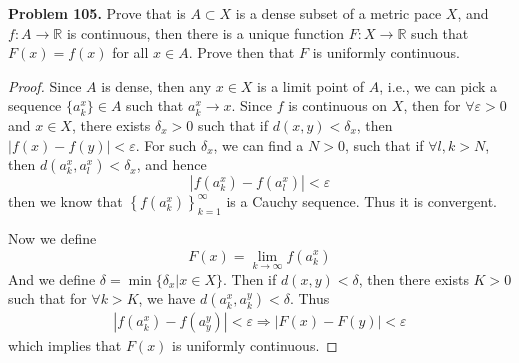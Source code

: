\documentclass[12pt,leqno]{amsart}
\theoremstyle{definition}
\numberwithin{equation}{subsection}
\begin{document}
\noindent
{\bf Problem 105.}
Prove that is $A\subset X$ is a dense subset of a metric pace $X$, and $f:A\to\mathbb{R}$ is continuous, then there is a unique function $F:X\to\mathbb{R}$ such that $F(x)=f(x)$ for all $x\in A$. Prove then that $F$ is uniformly continuous.
\begin{proof}
Since $A$ is dense, then any $x\in X$ is a limit point of $A$, i.e., we can pick a sequence $\{a_k^x\}\in A$ such that $a_k^x \to x$. Since $f$ is continuous on $X$, then for $\forall \varepsilon > 0$ and $x\in X$, there exists $\delta_x > 0$ such that if $d(x,y) < \delta_x$, then $\left|f(x) - f(y)\right| < \varepsilon$. For such $\delta_x$, we can find a $N > 0$, such that if $\forall l, k > N$, then $d\left(a_k^x, a_l^x\right) < \delta_x$, and hence 
$$\left|f(a_k^x) - f(a_l^x)\right| < \varepsilon$$
then we know that $\left\{f(a_k^x)\right\}^\infty_{k = 1}$ is a Cauchy sequence. Thus it is convergent. 

Now we define 
$$F(x) = \lim_{k\to\infty}f(a_k^x)$$
And we define $\delta = \min\{\delta_x| x\in X\}$. Then if $d(x,y) < \delta$, then there exists $K > 0$ such that for $\forall k > K$, we have $d\left(a^x_k, a^y_k\right) < \delta$. Thus
\begin{align*}
    \left|f(a_k^x) - f(a_y^y)\right| < \varepsilon \Rightarrow \left|F(x) - F(y)\right| < \varepsilon
\end{align*}
which implies that $F(x)$ is uniformly continuous. 
\end{proof}

\medskip
\end{document}
